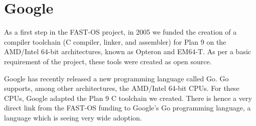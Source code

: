 \section{Google}
As a first step in the FAST-OS project, in 2005 we 
funded the creation of  a compiler toolchain (C compiler, linker, and assembler) for Plan 9 on the 
AMD/Intel 64-bit architectures, known as Opteron and EM64-T.
As per a basic requirement of the project, these
tools were created as open source. 

Google has recently released a new programming language called Go. Go supports, among other 
architectures, the AMD/Intel 64-bit CPUs. For these CPUs, Google adapted the  Plan 9 C toolchain
we created. There is hence a very direct link from the FAST-OS funding to Google's Go programming 
language, a language which is seeing very wide adoption. 
